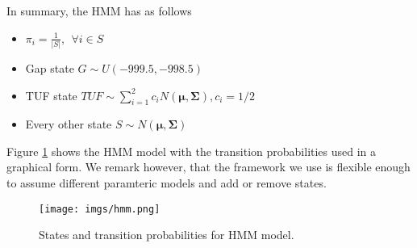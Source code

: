 




In summary, the HMM has as follows

\begin{itemize}
	\item $\pi_i = \frac{1}{|S|}, ~~ \forall i \in S$
	\item Gap state $G\sim U(-999.5, -998.5)$
	\item TUF state $TUF \sim \sum_{i=1}^{2} c_i N(\boldsymbol{\mu}, \boldsymbol{\Sigma}), c_i = 1/2$
	\item Every other state $S \sim N(\boldsymbol{\mu}, \boldsymbol{\Sigma})$  
\end{itemize}
Figure \ref{hmm_figure}
shows the HMM model with the transition probabilities used in a graphical form.
We remark however, that the framework we use is flexible enough to assume different paramteric models and add or remove states.

\begin{figure}[!htb]
	\begin{center}
		\texttt{[image: imgs/hmm.png]}
	\end{center}
	\caption{States and transition probabilities for HMM model.}
	\label{hmm_figure}
\end{figure} 

